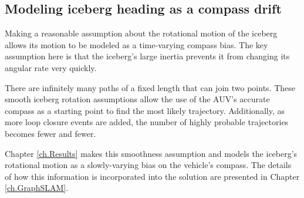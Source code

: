



\subsection{Modeling iceberg heading as a compass drift}

Making a reasonable assumption about the rotational motion of the iceberg allows its motion to be modeled as a time-varying compass bias. The key assumption here is that the iceberg's large inertia prevents it from changing its angular rate very quickly. 

There are infinitely many paths of a fixed length that can join two points. These smooth iceberg rotation assumptions allow the use of the AUV's accurate compass as a starting point to find the most likely trajectory. Additionally, as more loop closure events are added, the number of highly probable trajectories becomes fewer and fewer.

Chapter \ref{ch.Results} makes this smoothness assumption and models the iceberg's rotational motion as a slowly-varying bias on the vehicle's compass. The details of how this information is incorporated into the solution are presented in Chapter \ref{ch.GraphSLAM}.

